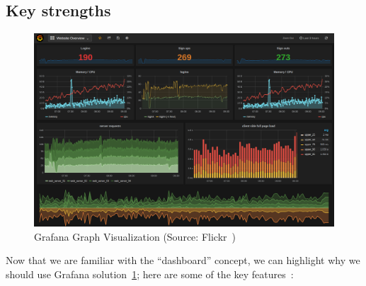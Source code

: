 \subsection{Key strengths}
\begin{figure}[ht]
    \centering
    \includegraphics[width=\linewidth]{content/chapter_3/images/grafana_dashboard.png}
    \caption{Grafana Graph Visualization (Source: Flickr~\cite{file:screenshots_grafana})}
    \label{fig:grafana_dashboard}
\end{figure}
Now that we are familiar with the ``dashboard'' concept, we can highlight why we should use Grafana solution~\ref{fig:grafana_dashboard};
here are some of the key features~\cite{Article:comprehensive_study_grafana}:
